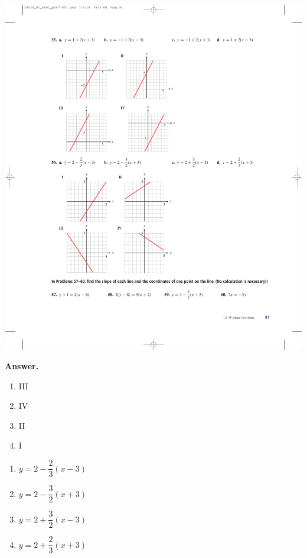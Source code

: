 \documentclass[10pt,]{book}
\theoremstyle{plain}
\theoremstyle{definition}
\theoremstyle{definition}
\theoremstyle{definition}
\theoremstyle{definition}
\numberwithin{equation}{part}
\begin{document}
\begin{exerciselist}
\begin{exercisegroup}
 \includegraphics[width=0.9\linewidth]{images/fig-ex-1-5-55}
%
\par\smallskip
\noindent\textbf{Answer.}\hypertarget{answer-191}{}\quad
\leavevmode%
\begin{multicols}{4}
\begin{enumerate}[label=*\alph**]
\item\hypertarget{li-1269}{}III%
\item\hypertarget{li-1270}{}IV%
\item\hypertarget{li-1271}{}II%
\item\hypertarget{li-1272}{}I%
\end{enumerate}
\end{multicols}
%
\exercise[56.]\hypertarget{exercise-342}{}\leavevmode%
\begin{multicols}{2}
\begin{enumerate}[label=*\alph**]
\item\hypertarget{li-1273}{}\(y = 2 - \dfrac{2}{3}(x - 3) \)%
\item\hypertarget{li-1274}{}\(y = 2 - \dfrac{3}{2}(x + 3) \)%
\item\hypertarget{li-1275}{}\(y = 2 + \dfrac{3}{2}(x - 3) \)%
\item\hypertarget{li-1276}{}\(y = 2 + \dfrac{2}{3}(x + 3) \)%
\end{enumerate}

\end{multicols}
\end{exercisegroup}
\end{exerciselist}
\end{document}

